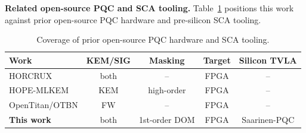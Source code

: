 \documentclass[10pt,conference]{IEEEtran}
\begin{document}



\textbf{Related open-source PQC and SCA tooling.} Table~\ref{tab:rel} positions this work against prior open-source PQC hardware and pre-silicon SCA tooling.

\begin{table}[t]
\centering
\caption{Coverage of prior open-source PQC hardware and SCA tooling.}
\label{tab:rel}
\scriptsize
\setlength{\tabcolsep}{3pt}
\renewcommand{\arraystretch}{0.8}
\begin{tabularx}{\columnwidth}{@{}l c c c c@{}}
\toprule
\textbf{Work} & \textbf{KEM/SIG} & \textbf{Masking}    &  \textbf{Target} & \textbf{Silicon TVLA} \\
\midrule
HORCRUX~\cite{horcrux}       & both & --               & FPGA  & --                  \\
HOPE-MLKEM~\cite{hope_mlkem} & KEM  & high-order       & FPGA  & --                  \\
OpenTitan/OTBN               & FW   & --               & FPGA & --                  \\
\textbf{This work}           & both & 1st-order DOM    & FPGA & Saarinen-PQC \\
\bottomrule
\end{tabularx}
\end{table}
\end{document}
